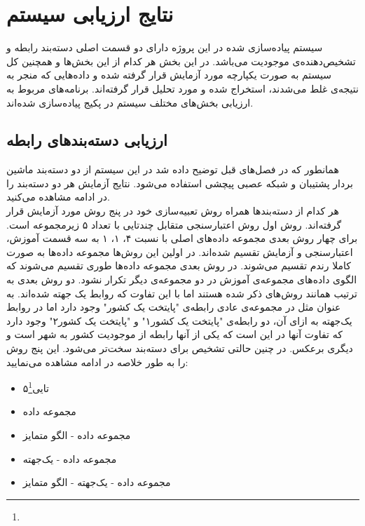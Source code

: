 \section{نتایج ارزیابی سیستم}
سیستم پیاده‌سازی شده در این پروژه دارای دو قسمت اصلی دسته‌بند رابطه و تشخیص‌دهنده‌ی موجودیت می‌باشد. در این بخش هر کدام از این بخش‌ها و همچنین کل سیستم به صورت یکپارچه مورد آزمایش قرار گرفته شده و داده‌هایی که منجر به نتیجه‌ی غلط می‌شدند، استخراج شده و مورد تحلیل قرار گرفته‌اند. برنامه‌های مربوط به ارزیابی بخش‌های مختلف سیستم در پکیج  پیاده‌سازی شده‌اند.
\subsection{ارزیابی دسته‌بندهای رابطه}
همانطور که در فصل‌های قبل توضیح داده شد در این سیستم از دو دسته‌بند ماشین بردار پشتیبان و شبکه عصبی پیچشی استفاده می‌شود. نتایج آزمایش هر دو دسته‌بند را در ادامه مشاهده می‌کنید.\\
هر کدام از دسته‌بندها همراه روش تعبیه‌سازی خود در پنج روش مورد آزمایش قرار گرفته‌اند. روش اول روش اعتبارسنجی متقابل چندتایی با تعداد ۵ زیرمجموعه است. برای چهار روش بعدی مجموعه داده‌های اصلی با نسبت ۴، ۱، ۱ به سه قسمت آموزش، اعتبارسنجی و آزمایش تقسیم شده‌اند. در اولین این روش‌ها مجموعه داده‌ها به صورت کاملا رندم تقسیم می‌شوند. در روش بعدی مجموعه داده‌ها طوری تقسیم می‌شوند که الگوی داده‌های مجموعه‌ی آموزش در دو مجموعه‌ی دیگر تکرار نشود. دو روش بعدی به ترتیب همانند روش‌های ذکر شده هستند اما با این تفاوت که روابط یک جهته شده‌اند. به عنوان مثل در مجموعه‌ی عادی رابطه‌ی "پایتخت یک کشور" وجود دارد اما در روابط یک‌جهته به ازای آن، دو رابطه‌ی "پایتخت یک کشور۱" و "پایتخت یک کشور۲" وجود دارد که تفاوت آنها در این است که یکی از آنها رابطه از موجودیت کشور به شهر است و دیگری برعکس. در چنین حالتی تشخیص برای دسته‌بند سخت‌تر می‌شود. این پنج روش را به طور خلاصه در ادامه مشاهده می‌نمایید:
\begin{itemize}
	\item ۵تایی\footnote{}
	\item مجموعه داده
	\item مجموعه داده - الگو متمایز
	\item مجموعه داده - یک‌جهته
	\item مجموعه داده - یک‌جهته - الگو متمایز
\end{itemize}
